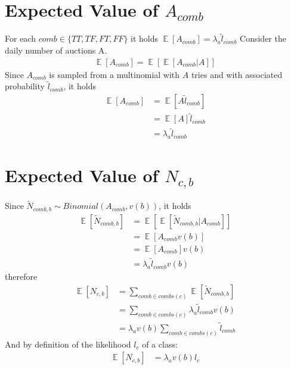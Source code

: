 \documentclass[11pt]{article} %
\DeclareMathOperator{\EX}{\mathbb{E}}
\begin{document}
\section{Expected Value of $A_{comb}$}\label{sec.acombproof}
For each $comb \in \{TT,TF,FT,FF\}$ it holds $\EX[A_{comb}] = \lambda_a \tilde{l}_{comb}$
\newline
\newline
Consider the daily number of auctions A.
\begin{align*}
\EX\left[A_{comb}\right] = \EX\left[\EX\left[A_{comb}|A\right]\right]
\end{align*}
Since $A_{comb}$ is sampled from a multinomial with $A$ tries and with associated probability $\tilde{l}_{comb}$, it holds
\begin{align*}
\EX\left[A_{comb}\right] &= \EX\left[A\tilde{l}_{comb}\right]\\
&= \EX\left[A\right]\tilde{l}_{comb}\\
&= \lambda_a\tilde{l}_{comb}
\end{align*}

\section{Expected Value of $N_{c,b}$}\label{sec.ncbproof}
Since $\tilde{N}_{comb,b} \sim Binomial(A_{comb}, v(b))$, it holds
\begin{align*}
\EX\left[\tilde{N}_{comb,b}\right] &= \EX\left[\EX\left[\tilde{N}_{comb,b}| A_{comb}\right]\right]\\
 &= \EX\left[A_{comb}v(b)\right]\\
 &= \EX\left[A_{comb}\right]v(b)\\
&= \lambda_a\tilde{l}_{comb}v(b)
\end{align*}
therefore
\begin{align*}
\EX\left[N_{c,b}\right] &= \sum_{comb \in combs(c)}{\EX\left[\tilde{N}_{comb,b}\right]}\\
&= \sum_{comb \in combs(c)}{\lambda_a\tilde{l}_{comb}v(b)}\\
&= \lambda_av(b)\sum_{comb \in combs(c)}{\tilde{l}_{comb}}
\end{align*}
And by definition of the likelihood $l_c$ of a class:
\begin{align*}
\EX\left[N_{c,b}\right]&= \lambda_av(b)l_c
\end{align*}

\clearpage
\end{document}
